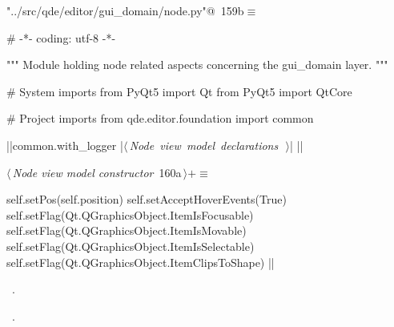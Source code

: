\documentclass[%
    a4paper,    %
    justified,  %
    nobib,      %
    openany     %
]{tufte-book}
\begin{document}
\begin{flushleft} \small
\begin{minipage}{\linewidth}\label{scrap188}\raggedright\small
{} \verb@"../src/qde/editor/gui_domain/node.py"@\nobreak\ {\footnotesize {159b}}$\equiv$
\vspace{-1ex}
\begin{pythoncode}
# -*- coding: utf-8 -*-

""" Module holding node related aspects concerning the gui_domain layer. """

# System imports
from PyQt5 import Qt
from PyQt5 import QtCore

# Project imports
from qde.editor.foundation import common

|\normalfont{}\fontfamily{}|common.with_logger
|\hbox{$\langle\,${\itshape Node view model declarations}\nobreak\ {\footnotesize {}}$\,\rangle$}|
|\NWsep|
\end{pythoncode}
\vspace{1.5ex}
\footnotesize
\begin{list}{}{\setlength{\itemsep}{-\parsep}\setlength{\itemindent}{-\leftmargin}}

\item{}
\end{list}
\end{minipage}\vspace{4ex}
\end{flushleft}
\begin{flushleft} \small
\begin{minipage}{\linewidth}\label{scrap189}\raggedright\small
{} $\langle\,${\itshape Node view model constructor}\nobreak\ {\footnotesize {160a}}$\,\rangle+\equiv$
\vspace{-1ex}
\begin{pythoncode}
    self.setPos(self.position)
    self.setAcceptHoverEvents(True)
    self.setFlag(Qt.QGraphicsObject.ItemIsFocusable)
    self.setFlag(Qt.QGraphicsObject.ItemIsMovable)
    self.setFlag(Qt.QGraphicsObject.ItemIsSelectable)
    self.setFlag(Qt.QGraphicsObject.ItemClipsToShape)
|\NWsep|
\end{pythoncode}
\vspace{1.5ex}
\footnotesize
\begin{list}{}{\setlength{\itemsep}{-\parsep}\setlength{\itemindent}{-\leftmargin}}
\item \NWtxtMacroDefBy\ .
\item \NWtxtMacroRefIn\ .

\item{}
\end{list}
\end{minipage}\vspace{4ex}
\end{flushleft}
\end{document}
